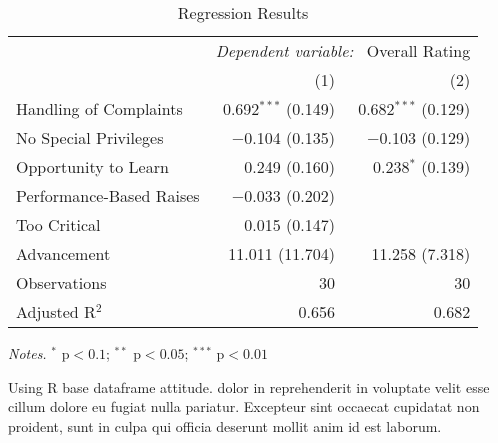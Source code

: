 \documentclass[12pt]{article}
\begin{document}
\begin{table}[tb] 
    \caption{Regression Results} 
    \label{tab:reg1}

    \begin{adjustbox}{center}
        \begin{threeparttable}
            \begin{tabular}{@{} 
                    lrr
                @{}} 

                \toprule
                & \multicolumn{2}{c}{\textit{Dependent variable:} \ Overall Rating} \\ 
                \cmidrule{2-3} 
                & (1) & (2) \\ 
                \hline

                Handling of Complaints & 0.692$^{***}$ (0.149) & 0.682$^{***}$ (0.129) \\ 
                No Special Privileges & $-$0.104 (0.135) & $-$0.103 (0.129) \\ 
                Opportunity to Learn & 0.249 (0.160) & 0.238$^{*}$ (0.139) \\ 
                Performance-Based Raises & $-$0.033 (0.202) &  \\ 
                Too Critical & 0.015 (0.147) &  \\ 
                Advancement & 11.011 (11.704) & 11.258 (7.318) \\ 
                \hline 
                Observations & 30 & 30 \\ 
                Adjusted R$^{2}$ & 0.656 & 0.682 \\ 
                
                \bottomrule
            \end{tabular} 

            \begin{tablenotes}\setlength{}\small
                \item {\small \textit{Notes.} $^{*}$ p$< 0.1$; $^{**}$ p$< 0.05$; $^{***}$ p$< 0.01$}
                \item {\small Using R base dataframe attitude. dolor in reprehenderit in voluptate velit esse cillum dolore eu fugiat nulla pariatur. Excepteur sint occaecat cupidatat non proident, sunt in culpa qui officia deserunt mollit anim id est laborum. } 
            \end{tablenotes}
        \end{threeparttable}
    \end{adjustbox}
\end{table}
\end{document}
